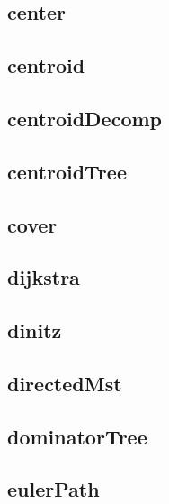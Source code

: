 \subsection{center}
\raggedbottom
\hrulefill
\subsection{centroid}
\raggedbottom
\hrulefill
\subsection{centroidDecomp}
\raggedbottom
\hrulefill
\subsection{centroidTree}
\raggedbottom
\hrulefill
\subsection{cover}
\raggedbottom
\hrulefill
\subsection{dijkstra}
\raggedbottom
\hrulefill
\subsection{dinitz}
\raggedbottom
\hrulefill
\subsection{directedMst}
\raggedbottom
\hrulefill
\subsection{dominatorTree}
\raggedbottom
\hrulefill
\subsection{eulerPath}
\raggedbottom
\hrulefill
